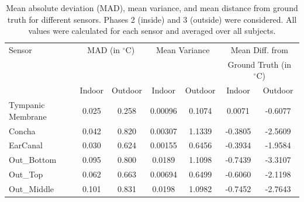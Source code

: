 \begin{table}[t]
\centering
\begin{tabular}{|p{2.5cm}|c|c|c|c|c|c|}
\hline
Sensor & \multicolumn{2}{c|}{MAD (in \(^\circ\text{C}\))} & \multicolumn{2}{c|}{Mean Variance} & \multicolumn{2}{c|}{Mean Diff. from} \\
 & \multicolumn{2}{c|}{} & \multicolumn{2}{c|}{} & \multicolumn{2}{c|}{Ground Truth (in \(^\circ\text{C}\))} \\
\hline
 & Indoor & Outdoor & Indoor & Outdoor & Indoor & Outdoor \\
\hline
Tympanic Membrane & 0.025 & 0.258 & 0.00096 & 0.1074 & 0.0071 & -0.6077 \\
Concha & 0.042 & 0.820 & 0.00307 & 1.1339 & -0.3805 & -2.5609 \\
EarCanal & 0.030 & 0.624 & 0.00155 & 0.6456 & -0.3934 & -1.9584 \\
Out\_Bottom & 0.095 & 0.800 & 0.0189 & 1.1098 & -0.7439 & -3.3107 \\
Out\_Top & 0.062 & 0.663 & 0.00694 & 0.6499 & -0.6060 & -2.1198 \\
Out\_Middle & 0.101 & 0.831 & 0.0198 & 1.0982 & -0.7452 & -2.7643 \\
\hline
\end{tabular}
\caption{Mean absolute deviation (MAD), mean variance, and mean distance from ground truth for different sensors. Phases 2 (inside) and 3 (outside) were considered. All values were calculated for each sensor and averaged over all subjects.}
\label{subsec:Evaluation:Study2:Hypothesis2:mean_variance_table}
\end{table}

